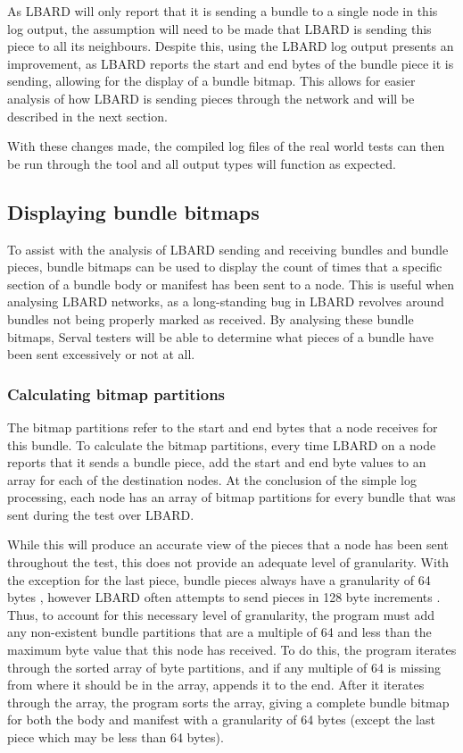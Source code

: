As LBARD will only report that it is sending a bundle to a single node in this log output, the assumption will need to be made that LBARD is sending this piece to all its neighbours.
Despite this, using the LBARD log output presents an improvement, as LBARD reports the start and end bytes of the bundle piece it is sending, allowing for the display of a bundle bitmap.
This allows for easier analysis of how LBARD is sending pieces through the network and will be described in the next section.

With these changes made, the compiled log files of the real world tests can then be run through the tool and all output types will function as expected.

\subsection{Displaying bundle bitmaps}
To assist with the analysis of LBARD sending and receiving bundles and bundle pieces, bundle bitmaps can be used to display the count of times that a specific section of a bundle body or manifest has been sent to a node.
This is useful when analysing LBARD networks, as a long-standing bug in LBARD revolves around bundles not being properly marked as received.
By analysing these bundle bitmaps, Serval testers will be able to determine what pieces of a bundle have been sent excessively or not at all.

\subsubsection{Calculating bitmap partitions}
The bitmap partitions refer to the start and end bytes that a node receives for this bundle.
To calculate the bitmap partitions, every time LBARD on a node reports that it sends a bundle piece, add the start and end byte values to an array for each of the destination nodes.
At the conclusion of the simple log processing, each node has an array of bitmap partitions for every bundle that was sent during the test over LBARD.

While this will produce an accurate view of the pieces that a node has been sent throughout the test, this does not provide an adequate level of granularity.
With the exception for the last piece, bundle pieces always have a granularity of 64 bytes \parencite{rhizomeDocumentation}, however LBARD often attempts to send pieces in 128 byte increments \parencite{rhizomeDocumentation}.
Thus, to account for this necessary level of granularity, the program must add any non-existent bundle partitions that are a multiple of 64 and less than the maximum byte value that this node has received.
To do this, the program iterates through the sorted array of byte partitions, and if any multiple of 64 is missing from where it should be in the array, appends it to the end.
After it iterates through the array, the program sorts the array, giving a complete bundle bitmap for both the body and manifest with a granularity of 64 bytes (except the last piece which may be less than 64 bytes).


